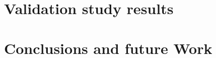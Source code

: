 \documentclass[11pt]{article}
\begin{document}
\label{sec:physical-contraption}


\newpage
\section{Validation study results}
\label{sec:numerical-results}


\section{Conclusions and future Work}
\label{sec:futureWork}





\end{document}
